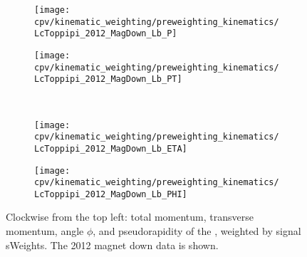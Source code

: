 \clearpage

\begin{figure}
  \begin{subfigure}[b]{0.4\textwidth}
    \texttt{[image: cpv/kinematic\_weighting/preweighting\_kinematics/LcToppipi\_2012\_MagDown\_Lb\_P]}
    \label{fig:cpv:kinematic_weighting:pre:Lb:P}
  \end{subfigure}
  \begin{subfigure}[b]{0.4\textwidth}
    \texttt{[image: cpv/kinematic\_weighting/preweighting\_kinematics/LcToppipi\_2012\_MagDown\_Lb\_PT]}
    \label{fig:cpv:kinematic_weighting:pre:Lb:PT}
  \end{subfigure}\\
  \begin{subfigure}[b]{0.4\textwidth}
    \texttt{[image: cpv/kinematic\_weighting/preweighting\_kinematics/LcToppipi\_2012\_MagDown\_Lb\_ETA]}
    \label{fig:cpv:kinematic_weighting:pre:Lb:ETA}
  \end{subfigure}
  \begin{subfigure}[b]{0.4\textwidth}
    \texttt{[image: cpv/kinematic\_weighting/preweighting\_kinematics/LcToppipi\_2012\_MagDown\_Lb\_PHI]}
    \label{fig:cpv:kinematic_weighting:pre:Lb:PHI}
  \end{subfigure}
  \caption{%
    Clockwise from the top left: total momentum, transverse momentum, angle 
    $\phi$, and pseudorapidity of the \PLambdab, weighted by signal sWeights.
    The 2012 magnet down data is shown.
  }
  \label{fig:cpv:kinematic_weighting:pre:Lb}
\end{figure}

